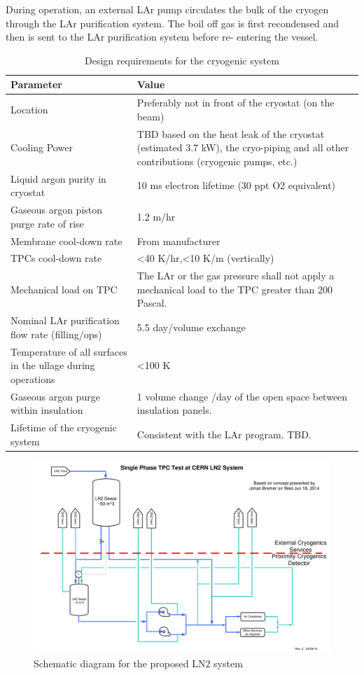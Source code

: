 During operation, an external LAr pump circulates the bulk of the cryogen through the LAr purification 
system. The boil off gas is first recondensed and then is sent to the LAr purification system before re-
entering the vessel.

\begin{table}[htpb]
\caption{Design requirements for the cryogenic system}
\label{tbl:cryo-design-parameters}
\centering
\begin{tabular}{|p{}|p{}|}
\hline
 \textbf{ Parameter} & \textbf{Value} \\ \hline
 Location & Preferably not in front of the cryostat (on the beam) \\ \hline
 Cooling Power & TBD based on the heat leak of the cryostat (estimated 3.7 kW), the cryo-piping and all other contributions (cryogenic pumps, etc.) \\ \hline
 Liquid argon purity in cryostat & 10 ms electron lifetime (30 ppt O2 equivalent) \\  \hline
 Gaseous argon piston purge rate of rise & 1.2 m/hr \\ \hline
 Membrane cool-down rate & From manufacturer \\  \hline
 TPCs cool-down rate & \textless40 K/hr,\textless10 K/m (vertically)
 \\ \hline
Mechanical load on TPC & The LAr or the gas pressure shall not apply a mechanical load to the TPC greater than 200 Pascal. \\ \hline
Nominal LAr purification flow rate (filling/ops) & 5.5 day/volume exchange \\ \hline
 Temperature of all surfaces in the ullage during operations & \textless100 K \\  \hline
 Gaseous argon purge within insulation & 1 volume change /day of the open space between insulation panels. \\ \hline
 Lifetime of the cryogenic system & Consistent with the LAr program. TBD. \\ \hline
\end{tabular}
\end{table}

\begin{figure}
\begin{center}
\includegraphics[width=.75\textwidth]{figures/proposed-LN2-system} %
\caption[Schematic diagram for the proposed LN2 system]{\label{fig:proposed-LN2-system}Schematic diagram for the proposed LN2 system}
\end{center}
\end{figure}

